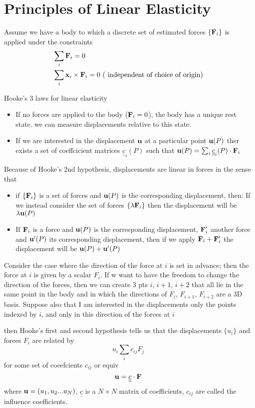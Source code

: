 \documentclass[12pt]{article}
\newcommand{\xx}{{\bf x}}
\newcommand{\uu}{{\bf u}}
\newcommand{\FF}{{\bf F}}
\newcommand{\cc}{{\underline{\underline c}}}
\begin{document}
\section{Principles of Linear Elasticity}
Assume we have a body to which a discrete set of estimated forces $\{\FF_i\}$ is applied under the constraints
\begin{align*}
&\sum_i \FF_i = 0 \\
&\sum_i \xx_i\times \FF_i = 0 \text{ ( independent of choice of origin)}
\end{align*}

Hooke's 3 laws for linear elasticity
\begin{itemize}
\item If no forces are applied to the body ($\FF_i = 0$), the body has a unique rest state.
we can measure displacements relative to this state.
\item If we are interested in the displacement $\uu$ at a particular point $\uu(P)$ ther exists a set of coeffcicient matrices $\cc_i(P)$ such that  $\uu(P) = \sum_i \cc_i(P) \cdot \FF_i$
\end{itemize}


Because of Hooke's 2nd hypothesis, displacements are linear in forces in the sense that 
\begin{itemize}
\item if $\{\FF_i\}$ is a set of forces and $\uu(P)$ is the corresponding displacement, then: 
If we instead consider the set of forces $\{\lambda \FF_i\}$ then the displacement will be $\lambda \uu(P)$

\item If $\FF_i$ is a force and $\uu(P)$ is the corresponding displacement, $\FF_i'$ another force and $\uu'(P)$ its corresponding displacement, then if we apply $\FF_i + \FF_i'$ the displacement will be $\uu(P) +\uu'(P)$ 
\end{itemize}

Consider the case where the direction of the force at $i$ is set in advance; then the force at $i$ is given by a scalar $F_i$. If w want to have the freedom to change the direction of the forces, then we can create 3 pts $i$, $i+1$, $i+2$ that all lie in the same point in the body and in which the directions of $F_i$, $F_{i+1}$, $F_{i+2}$ are a 3D basis. Suppose also that I am interested in the displacements only the points indexed by $i$, and only in this direction of the forces at $i$

then Hooke's first and second hypothesis tells us that the displacements $\{u_i\}$
and forces $F_i$ are related by
\[
u_i
\sum_i c_{ij}F_j
\]
for some set of coeefcients $c_{ij} $ or equiv
\[
\uu = \cc\cdot\FF
\]
where $\uu = (u_1, u_2 ... u_N)$, $\cc$ is a $N\times N$ matrix of coefficients, $c_{ij}$ are called the influence coefficients.
\end{document}
